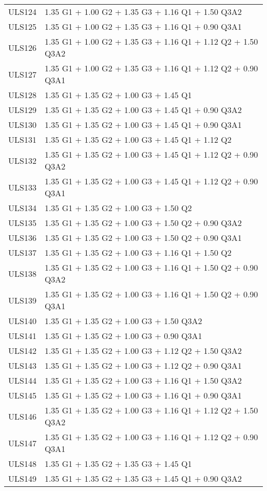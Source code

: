 \begin{center}
\begin{small}
\begin{longtable}{|l|p{10cm}|}
ULS124 & 1.35 G1 + 1.00 G2 + 1.35 G3 + 1.16 Q1 + 1.50 Q3A2\\
ULS125 & 1.35 G1 + 1.00 G2 + 1.35 G3 + 1.16 Q1 + 0.90 Q3A1\\
ULS126 & 1.35 G1 + 1.00 G2 + 1.35 G3 + 1.16 Q1 + 1.12 Q2 + 1.50 Q3A2\\
ULS127 & 1.35 G1 + 1.00 G2 + 1.35 G3 + 1.16 Q1 + 1.12 Q2 + 0.90 Q3A1\\
ULS128 & 1.35 G1 + 1.35 G2 + 1.00 G3 + 1.45 Q1\\
ULS129 & 1.35 G1 + 1.35 G2 + 1.00 G3 + 1.45 Q1 + 0.90 Q3A2\\
ULS130 & 1.35 G1 + 1.35 G2 + 1.00 G3 + 1.45 Q1 + 0.90 Q3A1\\
ULS131 & 1.35 G1 + 1.35 G2 + 1.00 G3 + 1.45 Q1 + 1.12 Q2\\
ULS132 & 1.35 G1 + 1.35 G2 + 1.00 G3 + 1.45 Q1 + 1.12 Q2 + 0.90 Q3A2\\
ULS133 & 1.35 G1 + 1.35 G2 + 1.00 G3 + 1.45 Q1 + 1.12 Q2 + 0.90 Q3A1\\
ULS134 & 1.35 G1 + 1.35 G2 + 1.00 G3 + 1.50 Q2\\
ULS135 & 1.35 G1 + 1.35 G2 + 1.00 G3 + 1.50 Q2 + 0.90 Q3A2\\
ULS136 & 1.35 G1 + 1.35 G2 + 1.00 G3 + 1.50 Q2 + 0.90 Q3A1\\
ULS137 & 1.35 G1 + 1.35 G2 + 1.00 G3 + 1.16 Q1 + 1.50 Q2\\
ULS138 & 1.35 G1 + 1.35 G2 + 1.00 G3 + 1.16 Q1 + 1.50 Q2 + 0.90 Q3A2\\
ULS139 & 1.35 G1 + 1.35 G2 + 1.00 G3 + 1.16 Q1 + 1.50 Q2 + 0.90 Q3A1\\
ULS140 & 1.35 G1 + 1.35 G2 + 1.00 G3 + 1.50 Q3A2\\
ULS141 & 1.35 G1 + 1.35 G2 + 1.00 G3 + 0.90 Q3A1\\
ULS142 & 1.35 G1 + 1.35 G2 + 1.00 G3 + 1.12 Q2 + 1.50 Q3A2\\
ULS143 & 1.35 G1 + 1.35 G2 + 1.00 G3 + 1.12 Q2 + 0.90 Q3A1\\
ULS144 & 1.35 G1 + 1.35 G2 + 1.00 G3 + 1.16 Q1 + 1.50 Q3A2\\
ULS145 & 1.35 G1 + 1.35 G2 + 1.00 G3 + 1.16 Q1 + 0.90 Q3A1\\
ULS146 & 1.35 G1 + 1.35 G2 + 1.00 G3 + 1.16 Q1 + 1.12 Q2 + 1.50 Q3A2\\
ULS147 & 1.35 G1 + 1.35 G2 + 1.00 G3 + 1.16 Q1 + 1.12 Q2 + 0.90 Q3A1\\
ULS148 & 1.35 G1 + 1.35 G2 + 1.35 G3 + 1.45 Q1\\
ULS149 & 1.35 G1 + 1.35 G2 + 1.35 G3 + 1.45 Q1 + 0.90 Q3A2\\

\end{longtable}
\end{small}
\end{center}
